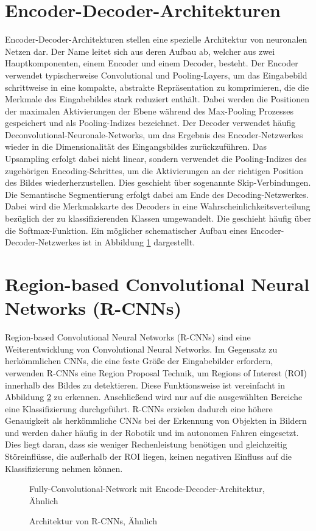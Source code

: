 \section{Encoder-Decoder-Architekturen}
Encoder-Decoder-Architekturen stellen eine spezielle Architektur von neuronalen
Netzen dar. Der Name leitet sich aus deren Aufbau ab, welcher aus zwei
Hauptkomponenten, einem Encoder und einem Decoder, besteht. Der Encoder
verwendet typischerweise Convolutional und Pooling-Layers, um das Eingabebild
schrittweise in eine kompakte, abstrakte Repräsentation zu komprimieren, die
die Merkmale des Eingabebildes stark reduziert enthält. Dabei werden die
Positionen der maximalen Aktivierungen der Ebene während des Max-Pooling
Prozesses gespeichert und als Pooling-Indizes bezeichnet. Der Decoder verwendet
häufig Deconvolutional-Neuronale-Networks, um das Ergebnis des
Encoder-Netzwerkes wieder in die Dimensionalität des Eingangsbildes
zurückzuführen. Das Upsampling erfolgt dabei nicht linear, sondern verwendet
die Pooling-Indizes des zugehörigen Encoding-Schrittes, um die Aktivierungen an
der richtigen Position des Bildes wiederherzustellen. Dies geschieht über
sogenannte Skip-Verbindungen. Die Semantische Segmentierung erfolgt dabei am
Ende des Decoding-Netzwerkes. Dabei wird die Merkmalskarte des Decoders in eine
Wahrscheinlichkeitsverteilung bezüglich der zu klassifizierenden Klassen
umgewandelt. Die geschieht häufig über die Softmax-Funktion. Ein möglicher
schematischer Aufbau eines Encoder-Decoder-Netzwerkes ist in Abbildung
\ref{fig:FCN} dargestellt. \cite{7803544}

\section{Region-based Convolutional Neural Networks (R-CNNs)}
Region-based Convolutional Neural Networks (R-CNNs) sind eine Weiterentwicklung
von Convolutional Neural Networks. Im Gegensatz zu herkömmlichen CNNs, die eine
feste Größe der Eingabebilder erfordern, verwenden R-CNNs eine Region Proposal
Technik, um Regions of Interest (ROI) innerhalb des Bildes zu detektieren.
Diese Funktionsweise ist vereinfacht in Abbildung \ref{fig:RCNN} zu erkennen.
Anschließend wird nur auf die ausgewählten Bereiche eine Klassifizierung
durchgeführt. R-CNNs erzielen dadurch eine höhere Genauigkeit als herkömmliche
CNNs bei der Erkennung von Objekten in Bildern und werden daher häufig in der
Robotik und im autonomen Fahren eingesetzt. Dies liegt daran, dass sie weniger
Rechenleistung benötigen und gleichzeitig Störeinflüsse, die außerhalb der ROI
liegen, keinen negativen Einfluss auf die Klassifizierung nehmen können.
\cite{Girshick_2015_ICCV}
\begin{figure}[!b]
    \centering
    
    \captionsetup{font=small} %

    \caption[Fully-Convolutional-Network mit Encode-Decoder-Architektur]{Fully-Convolutional-Network mit Encode-Decoder-Architektur, Ähnlich  \cite{sanjar2020improved}}
    \label{fig:FCN}
\end{figure}

\begin{figure}[!b]
    \centering
    
    \captionsetup{font=small} %

    \caption[Architektur von R-CNNs]{Architektur von R-CNNs, Ähnlich \cite{girshick2014rich}}
    \label{fig:RCNN}
\end{figure}
